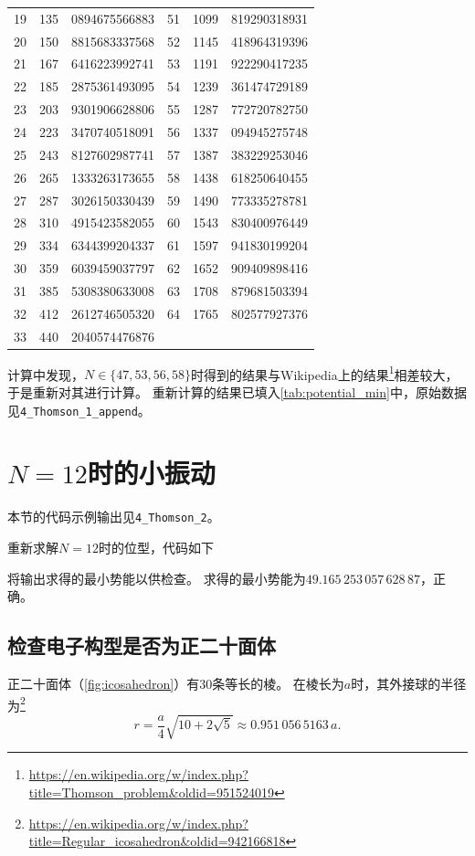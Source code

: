 \begin{table}
\begin{tabular}{cr@{.}l|cr@{.}l}
19 & 135&0894675566883 & 51 & 1099&819290318931 \\
20 & 150&8815683337568 & 52 & 1145&418964319396 \\
21 & 167&6416223992741 & 53 & 1191&922290417235 \\
22 & 185&2875361493095 & 54 & 1239&361474729189 \\
23 & 203&9301906628806 & 55 & 1287&772720782750 \\
24 & 223&3470740518091 & 56 & 1337&094945275748 \\
25 & 243&8127602987741 & 57 & 1387&383229253046 \\
26 & 265&1333263173655 & 58 & 1438&618250640455 \\
27 & 287&3026150330439 & 59 & 1490&773335278781 \\
28 & 310&4915423582055 & 60 & 1543&830400976449 \\
29 & 334&6344399204337 & 61 & 1597&941830199204 \\
30 & 359&6039459037797 & 62 & 1652&909409898416 \\
31 & 385&5308380633008 & 63 & 1708&879681503394 \\
32 & 412&2612746505320 & 64 & 1765&802577927376 \\
33 & 440&2040574476876 &  & \multicolumn{2}{c}{}\\ \bottomrule
\end{tabular}
\end{table}

计算中发现，$N\in\{47,53,56,58\}$时得到的结果与Wikipedia上的结果\footnote{\url{https://en.wikipedia.org/w/index.php?title=Thomson_problem&oldid=951524019}}相差较大，于是重新对其进行计算。
重新计算的结果已填入\autoref{tab:potential_min}中，原始数据见\texttt{4\_Thomson\_1\_append}。

\section{\texorpdfstring{$N=12$}{N = 12}时的小振动}
本节的代码示例输出见\texttt{4\_Thomson\_2}。

重新求解$N=12$时的位型，代码如下
{
    \linespread{1.0}
    
}
将输出求得的最小势能以供检查。
求得的最小势能为$49.165\,253\,057\,628\,87$，正确。

\subsection{检查电子构型是否为正二十面体}
正二十面体（\autoref{fig:icosahedron}）有30条等长的棱。
在棱长为$a$时，其外接球的半径为\footnote{\url{https://en.wikipedia.org/w/index.php?title=Regular_icosahedron&oldid=942166818}}
\begin{equation}
    r = \frac{a}{4} \sqrt{10+2\sqrt{5}} \approx 0.951\,056\,5163\,a.
\end{equation}

